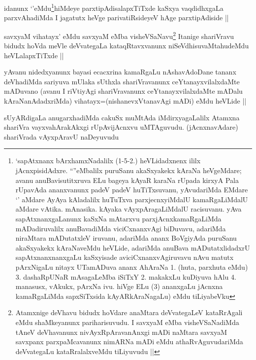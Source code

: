 \begin{artha}
idanunx `\stext'eMdu\footnote{`sapAtxnanx bArxhamxNadalilx (1-5-2.) heVLidadxnenx ililx jAcnxpisidAdxre. ``\stext''eMbalilx puruSanu akaSxyakekx kAraNa heVgeMdare; avanu anuBavisutitxruva ELu bageya kAyaR karaNa rUpada kirxyA Pala rUpavAda ananxvanunx padeV padeV huTiTxsuvanu, yAvudariMda EMdare `\stext' aMdare AyAya kAladalilx huTuTxva parxjecnxyiMdalU kamaRgaLiMdalU aMdare vAtika. mAnasika. kAyaka vAyxpAragaLiMdalU racisuvanu. yAva sapAtxnanxgaLanunx kaSxNa mAtarxvu parxjAcnxkamaRgaLiMda mADadiruvalilx anuBavadiMda viciCxnanxvAgi biDuvavu, adariMda niraMtara mADutatxleV iruvanu, adariMda ananx BoVgiyAda puruSanu akaSxyakekx kAraNaveMdu heVLide, adariMda anuBava mADutatxlidadxrU sapAtxnanxnanxgaLu kaSxyisade aviciCxnanxvAgiruvavu nAvu matutx pArxNigaLu nitayx UTamADuva ananx AhAraNa 1. (huta, parxhuta eMdu) 3. dashaRpUNaR mAsagaLeMba iSiTxY 2. makakxLu kuDiyuva hAlu 4. manasusx, vAkukx, pArxNa ivu. hiVge ELu (3) ananxgaLu jAcnxna kamaRgaLiMda sapxSiTxsida kAyARkAraNagaLu) eMdu tiLiyabeVku}hiMdeye parxtipAdisalapxTiTxde kaSxya vaqdidhxgaLa parxvAhadiMda I jagatutx heVge parivatiRsideyeV hAge parxtipAdiside ||
\end{artha}

\begin{artha}
savxyaM vihatayx' eMdu savxyaM eMba visheVSaNavu\footnote{Atamxnige deVhavu bidudx hoVdare anaMtara deVvategaLeV kataRrAgali eMdu shaMkeyanunx pariharisuvudu. I savxyaM eMba visheVSaNadiMda tAneV deVhavanunx nivAyxRpAravanAnxgi mADi naMtara savxyaM savxpanx parxpaMcavanunx nimARNa mADi eMdu athaRvAguvudariMda deVvategaLu kataRralalxveMdu tiLiyuvudu ||} Itanige shariVravu bidudx hoVda meVle deVvategaLa kataqRtavxvanunx niSeVdhisuvaMtahudeMdu heVLalapxTiTxde ||
\end{artha}


\begin{artha}
yAvanu nidedxyanunx bayasi ecacxrina kamaRgaLu nAshavAdoDane tananx deVhadiMda sariyuva mUlaka sUthxla shariVravanunx ceYtanayxvilalxdaMte mADuvano (avanu I riVtiyAgi shariVravanunx ceYtanayxvilalxdaMte mADalu kAraNanAdadxriMda) vihatayx=(nishanevxVtanavAgi mADi) eMdu heVLide ||
\end{artha}


\begin{artha}
sUyARdigaLa anugarxhadiMda cakuSx muMtAda iMdirxyagaLalilx Atamxna shariVra vayxvahArakAkxgi rUpAvijAcnxvu uMTAguvudu. (jAcnxnavAdare) shariVrada vAyxpAravU naDeyuvudu
\end{artha}


